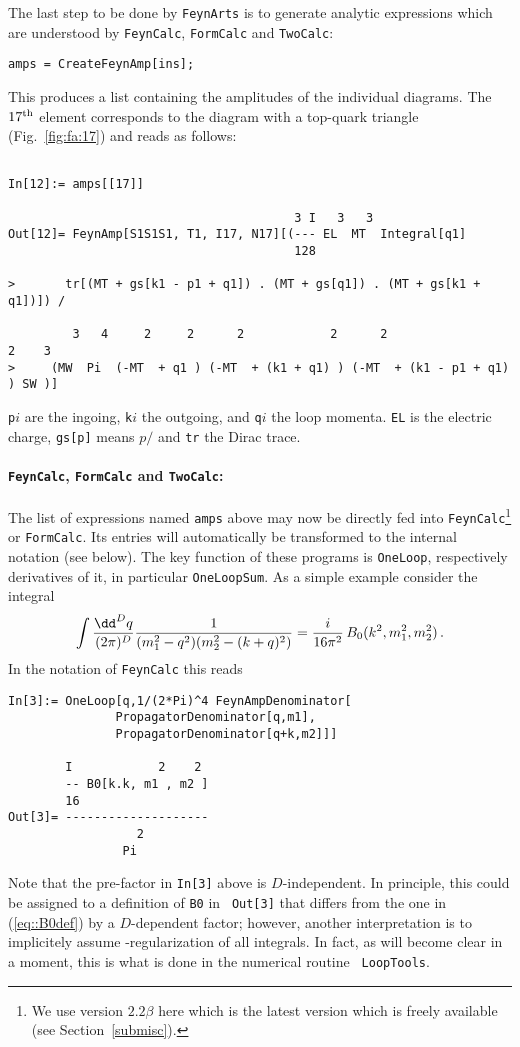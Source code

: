 The last step to be done by {\tt FeynArts} is to generate analytic
expressions which are understood by {\tt FeynCalc}, {\tt FormCalc} and
{\tt TwoCalc}:
\begin{verbatim}
amps = CreateFeynAmp[ins];
\end{verbatim}
This produces a list containing the amplitudes of the individual diagrams. The
$17^{\rm th}$ element corresponds to the diagram with a top-quark
triangle (Fig.~\ref{fig:fa:17}) and reads as follows:
\begin{verbatim}

In[12]:= amps[[17]]

                                        3 I   3   3
Out[12]= FeynAmp[S1S1S1, T1, I17, N17][(--- EL  MT  Integral[q1] 
                                        128
 
>       tr[(MT + gs[k1 - p1 + q1]) . (MT + gs[q1]) . (MT + gs[k1 + q1])]) / 
 
         3   4     2     2      2            2      2                 2    3
>     (MW  Pi  (-MT  + q1 ) (-MT  + (k1 + q1) ) (-MT  + (k1 - p1 + q1) ) SW )]
\end{verbatim}
{\tt p}$i$ are the ingoing, {\tt k}$i$ the outgoing, and {\tt q}$i$ the
loop momenta. {\tt EL} is the electric charge, {\tt gs[p]} means
$p\!\!\!/$ and {\tt tr} the Dirac trace.

\paragraph{{\tt FeynCalc}, {\tt FormCalc} and {\tt TwoCalc}:}
%
The list of expressions named {\tt amps} above may now be directly fed
into {\tt FeynCalc}\footnote{ We use version $2.2\beta$ here which is
  the latest version which is freely available (see
  Section~\ref{submisc}). } or {\tt FormCalc}.  Its entries will
automatically be transformed to the internal notation (see below).  The
key function of these programs is {\tt OneLoop}, respectively derivatives of
it, in particular {\tt OneLoopSum}. As a simple example consider the
integral
\begin{equation}
\int{\dd^D q\over (2\pi)^D}{1\over (m_1^2 - q^2)(m_2^2-(k+q)^2)} =
{i\over 16\pi^2}\, B_0(k^2,m_1^2,m_2^2)\,.
\label{eq::B0def}
\end{equation}
In the notation of {\tt FeynCalc} this reads
\begin{verbatim}
In[3]:= OneLoop[q,1/(2*Pi)^4 FeynAmpDenominator[
               PropagatorDenominator[q,m1],
               PropagatorDenominator[q+k,m2]]]

        I            2    2
        -- B0[k.k, m1 , m2 ]
        16
Out[3]= --------------------
                  2
                Pi
\end{verbatim}
Note that the pre-factor in {\tt In[3]} above is $D$-independent.  In
principle, this could be assigned to a definition of {\tt B0} in {\tt
  Out[3]} that differs from the one in (\ref{eq::B0def}) by a
$D$-dependent factor; however, another interpretation is to implicitely
assume \msbar-regularization of all integrals. In fact, as will become
clear in a moment, this is what is done in the numerical routine {\tt
  LoopTools}.  

